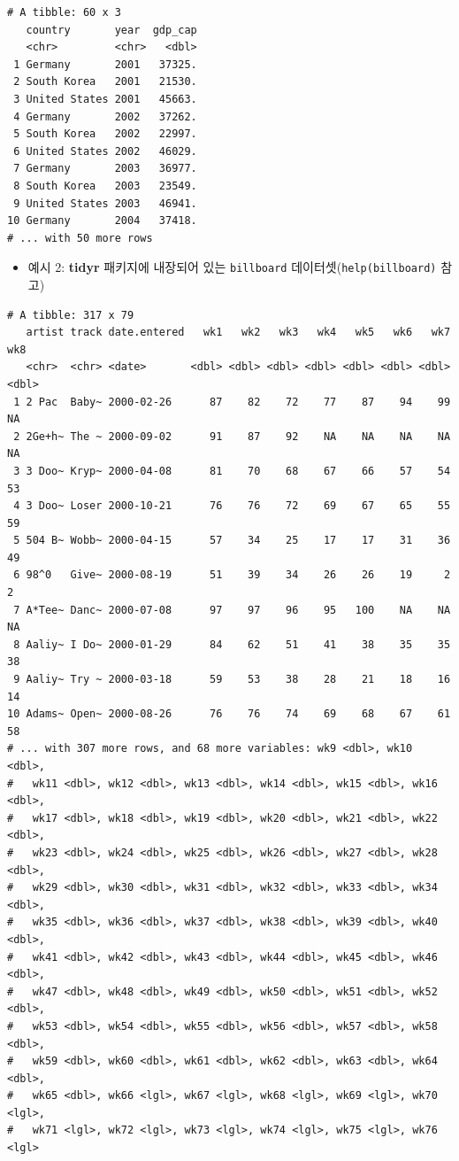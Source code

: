 \documentclass[
  11pt,
]{krantz}
\newenvironment{Shaded}{\begin{snugshade}}{\end{snugshade}}
\newcommand{\NormalTok}[1]{#1}
\newcommand{\OperatorTok}[1]{\textcolor[rgb]{0.43,0.43,0.43}{\textbf{#1}}}
\newcommand{\StringTok}[1]{\textcolor[rgb]{0.5,0.5,0.5}{#1}}
\providecommand{\tightlist}{%
  \setlength{\itemsep}{0pt}\setlength{\parskip}{0pt}}
\begin{document}
\begin{verbatim}
# A tibble: 60 x 3
   country       year  gdp_cap
   <chr>         <chr>   <dbl>
 1 Germany       2001   37325.
 2 South Korea   2001   21530.
 3 United States 2001   45663.
 4 Germany       2002   37262.
 5 South Korea   2002   22997.
 6 United States 2002   46029.
 7 Germany       2003   36977.
 8 South Korea   2003   23549.
 9 United States 2003   46941.
10 Germany       2004   37418.
# ... with 50 more rows
\end{verbatim}

\normalsize

\begin{itemize}
\tightlist
\item
  예시 2: \textbf{tidyr} 패키지에 내장되어 있는 \texttt{billboard} 데이터셋(\texttt{help(billboard)} 참고)
\end{itemize}

\footnotesize

\begin{Shaded}
\end{Shaded}

\begin{verbatim}
# A tibble: 317 x 79
   artist track date.entered   wk1   wk2   wk3   wk4   wk5   wk6   wk7   wk8
   <chr>  <chr> <date>       <dbl> <dbl> <dbl> <dbl> <dbl> <dbl> <dbl> <dbl>
 1 2 Pac  Baby~ 2000-02-26      87    82    72    77    87    94    99    NA
 2 2Ge+h~ The ~ 2000-09-02      91    87    92    NA    NA    NA    NA    NA
 3 3 Doo~ Kryp~ 2000-04-08      81    70    68    67    66    57    54    53
 4 3 Doo~ Loser 2000-10-21      76    76    72    69    67    65    55    59
 5 504 B~ Wobb~ 2000-04-15      57    34    25    17    17    31    36    49
 6 98^0   Give~ 2000-08-19      51    39    34    26    26    19     2     2
 7 A*Tee~ Danc~ 2000-07-08      97    97    96    95   100    NA    NA    NA
 8 Aaliy~ I Do~ 2000-01-29      84    62    51    41    38    35    35    38
 9 Aaliy~ Try ~ 2000-03-18      59    53    38    28    21    18    16    14
10 Adams~ Open~ 2000-08-26      76    76    74    69    68    67    61    58
# ... with 307 more rows, and 68 more variables: wk9 <dbl>, wk10 <dbl>,
#   wk11 <dbl>, wk12 <dbl>, wk13 <dbl>, wk14 <dbl>, wk15 <dbl>, wk16 <dbl>,
#   wk17 <dbl>, wk18 <dbl>, wk19 <dbl>, wk20 <dbl>, wk21 <dbl>, wk22 <dbl>,
#   wk23 <dbl>, wk24 <dbl>, wk25 <dbl>, wk26 <dbl>, wk27 <dbl>, wk28 <dbl>,
#   wk29 <dbl>, wk30 <dbl>, wk31 <dbl>, wk32 <dbl>, wk33 <dbl>, wk34 <dbl>,
#   wk35 <dbl>, wk36 <dbl>, wk37 <dbl>, wk38 <dbl>, wk39 <dbl>, wk40 <dbl>,
#   wk41 <dbl>, wk42 <dbl>, wk43 <dbl>, wk44 <dbl>, wk45 <dbl>, wk46 <dbl>,
#   wk47 <dbl>, wk48 <dbl>, wk49 <dbl>, wk50 <dbl>, wk51 <dbl>, wk52 <dbl>,
#   wk53 <dbl>, wk54 <dbl>, wk55 <dbl>, wk56 <dbl>, wk57 <dbl>, wk58 <dbl>,
#   wk59 <dbl>, wk60 <dbl>, wk61 <dbl>, wk62 <dbl>, wk63 <dbl>, wk64 <dbl>,
#   wk65 <dbl>, wk66 <lgl>, wk67 <lgl>, wk68 <lgl>, wk69 <lgl>, wk70 <lgl>,
#   wk71 <lgl>, wk72 <lgl>, wk73 <lgl>, wk74 <lgl>, wk75 <lgl>, wk76 <lgl>
\end{verbatim}
\end{document}
